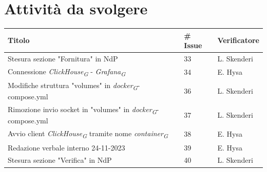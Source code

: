\documentclass{article}
\begin{document}
\section{Attività da svolgere}
    \begin{center}
        \begin{tabular}{|C{7cm}|C{1,5cm}|C{3cm}|}
            \hline
            \textbf{Titolo} & \textbf{\# Issue} & \textbf{Verificatore} \\
            \hline\hline
            Stesura sezione "Fornitura" in NdP & 33 & L. Skenderi\\
            \hline
            Connessione \textit{ClickHouse}\textsubscript{\textit{G}} - \textit{Grafana}\textsubscript{\textit{G}} & 34 & E. Hysa\\
            \hline
            Modifiche struttura "volumes" in \textit{docker}\textsubscript{\textit{G}}-compose.yml & 36 & L. Skenderi\\
            \hline
            Rimozione invio socket in "volumes" in \textit{docker}\textsubscript{\textit{G}}-compose.yml & 37 & L. Skenderi\\
            \hline
            Avvio client \textit{ClickHouse}\textsubscript{\textit{G}} tramite nome \textit{container}\textsubscript{\textit{G}} & 38 & E. Hysa\\
            \hline
            Redazione verbale interno 24-11-2023 & 39 & E. Hysa\\
            \hline
            Stesura sezione "Verifica" in NdP & 40 & L. Skenderi\\
            \hline
        \end{tabular}
    \end{center}
\end{document}
